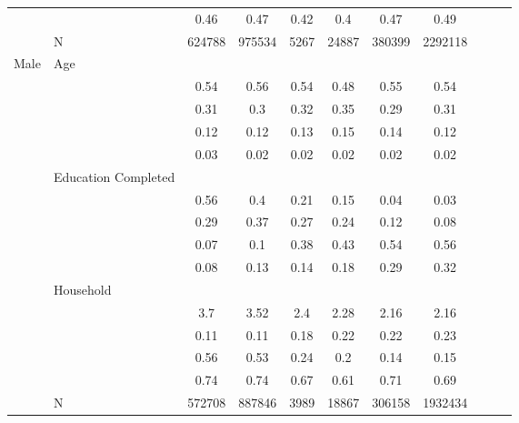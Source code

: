 \begin{table}[ht]
\begin{tabular}{l>{\raggedright\arraybackslash}p{3.2cm}|ccccccccc}
   & \multicolumn{1}{>{\raggedleft\arraybackslash}p{3.4cm}|}{\makebox[3.4cm][r]{Married/Cohabiting }} & 0.46 & 0.47 & 0.42 & 0.4 & 0.47 & 0.49 \\ 
   & N & 624788 & 975534 & 5267 & 24887 & 380399 & 2292118 \\ 
  Male & Age &  &  &  &  &  &  \\ 
   & \multicolumn{1}{>{\raggedleft\arraybackslash}p{1.5cm}|}{\makebox[1.5cm][r]{60 - 69 }} & 0.54 & 0.56 & 0.54 & 0.48 & 0.55 & 0.54 \\ 
   & \multicolumn{1}{>{\raggedleft\arraybackslash}p{1.5cm}|}{\makebox[1.5cm][r]{70 - 79 }} & 0.31 & 0.3 & 0.32 & 0.35 & 0.29 & 0.31 \\ 
   & \multicolumn{1}{>{\raggedleft\arraybackslash}p{1.5cm}|}{\makebox[1.5cm][r]{80 - 89 }} & 0.12 & 0.12 & 0.13 & 0.15 & 0.14 & 0.12 \\ 
   & \multicolumn{1}{>{\raggedleft\arraybackslash}p{1.5cm}|}{\makebox[1.5cm][r]{90 plus }} & 0.03 & 0.02 & 0.02 & 0.02 & 0.02 & 0.02 \\ 
   & Education Completed &  &  &  &  &  &  \\ 
   & \multicolumn{1}{>{\raggedleft\arraybackslash}p{3.2cm}|}{\makebox[3.2cm][r]{Less than Primary }} & 0.56 & 0.4 & 0.21 & 0.15 & 0.04 & 0.03 \\ 
   & \multicolumn{1}{>{\raggedleft\arraybackslash}p{1.7cm}|}{\makebox[1.7cm][r]{Primary }} & 0.29 & 0.37 & 0.27 & 0.24 & 0.12 & 0.08 \\ 
   & \multicolumn{1}{>{\raggedleft\arraybackslash}p{2cm}|}{\makebox[2cm][r]{Secondary }} & 0.07 & 0.1 & 0.38 & 0.43 & 0.54 & 0.56 \\ 
   & \multicolumn{1}{>{\raggedleft\arraybackslash}p{2cm}|}{\makebox[2cm][r]{University }} & 0.08 & 0.13 & 0.14 & 0.18 & 0.29 & 0.32 \\ 
   & Household &  &  &  &  &  &  \\ 
   & \multicolumn{1}{>{\raggedleft\arraybackslash}p{2.7cm}|}{\makebox[2.7cm][r]{Household Size }} & 3.7 & 3.52 & 2.4 & 2.28 & 2.16 & 2.16 \\ 
   & \multicolumn{1}{>{\raggedleft\arraybackslash}p{2.2cm}|}{\makebox[2.2cm][r]{Lives Alone }} & 0.11 & 0.11 & 0.18 & 0.22 & 0.22 & 0.23 \\ 
   & \multicolumn{1}{>{\raggedleft\arraybackslash}p{2.9cm}|}{\makebox[2.9cm][r]{Lives with Child }} & 0.56 & 0.53 & 0.24 & 0.2 & 0.14 & 0.15 \\ 
   & \multicolumn{1}{>{\raggedleft\arraybackslash}p{3.4cm}|}{\makebox[3.4cm][r]{Married/Cohabiting }} & 0.74 & 0.74 & 0.67 & 0.61 & 0.71 & 0.69 \\ 
   & N & 572708 & 887846 & 3989 & 18867 & 306158 & 1932434 \\ 
   \hline
\end{tabular}
\endgroup
\end{table}
